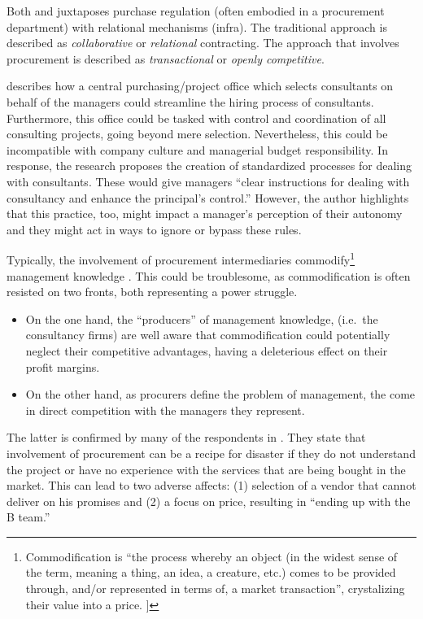 \documentclass[12pt]{article}
\begin{document}
Both \citet[4-5]{sturdy2021} and \citet[164]{lonsdale2017} juxtaposes
purchase regulation (often embodied in a procurement department) with
relational mechanisms (infra). The traditional approach is described as
\emph{collaborative} or \emph{relational} contracting. The approach that
involves procurement is described as \emph{transactional} or
\emph{openly competitive}.

\citet[307]{honer2006} describes how a central purchasing/project office
which selects consultants on behalf of the managers could streamline the
hiring process of consultants. Furthermore, this office could be tasked
with control and coordination of all consulting projects, going beyond
mere selection. Nevertheless, this could be incompatible with company
culture and managerial budget responsibility. In response, the research
proposes the creation of standardized processes for dealing with
consultants. These would give managers ``clear instructions for dealing
with consultancy and enhance the principal's control.'' However, the
author highlights that this practice, too, might impact a manager's
perception of their autonomy and they might act in ways to ignore or
bypass these rules.

Typically, the involvement of procurement intermediaries
commodify\footnote{Commodification is ``the process whereby an object
  (in the widest sense of the term, meaning a thing, an idea, a
  creature, etc.) comes to be provided through, and/or represented in
  terms of, a market transaction'', crystalizing their value into a
  price. \citep{carvalho2008}{]}} management knowledge \citep[
205-206]{omahoney2013}. This could be troublesome, as commodification is
often resisted on two fronts, both representing a power struggle.

\begin{itemize}
\item
  On the one hand, the ``producers'' of management knowledge, (i.e.~the
  consultancy firms) are well aware that commodification could
  potentially neglect their competitive advantages, having a deleterious
  effect on their profit margins.
\item
  On the other hand, as procurers define the problem of management, the
  come in direct competition with the managers they represent.
\end{itemize}

The latter is confirmed by many of the respondents in
\citet[161-163]{lonsdale2017}. They state that involvement of
procurement can be a recipe for disaster if they do not understand the
project or have no experience with the services that are being bought in
the market. This can lead to two adverse affects: (1) selection of a
vendor that cannot deliver on his promises and (2) a focus on price,
resulting in ``ending up with the B team.''
\end{document}
